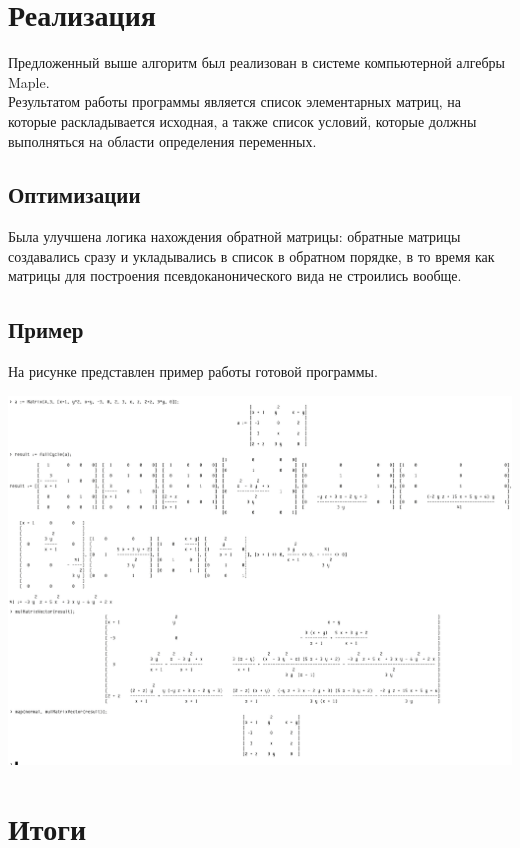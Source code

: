 \documentclass[14pt, a4paper]{extreport}
\begin{document}
\chapter{Реализация}
	Предложенный выше алгоритм был реализован в системе компьютерной алгебры Maple.\\
	Результатом работы программы является список элементарных матриц, на которые раскладывается исходная,
	а также список условий, которые должны выполняться на области определения переменных.
	\section{Оптимизации}
	Была улучшена логика нахождения обратной матрицы: обратные матрицы
	создавались сразу и укладывались в список в обратном порядке, в то время как
	матрицы для построения псевдоканонического вида не строились вообще.
	\newpage
	\section{Пример}
	На рисунке представлен пример работы готовой программы.\\
	\begin{center}
		\includegraphics[width=\textwidth]{result2.png}
	\end{center}
\chapter{Итоги}
\end{document}
